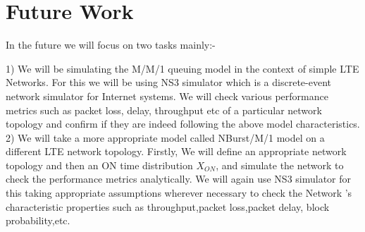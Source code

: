 \chapter{Future Work}

In the future we will focus on two tasks mainly:-

1) We will be simulating the M/M/1 queuing model in the context of simple LTE Networks. For this we will be using NS3 simulator which is a discrete-event network simulator for Internet systems. We will check various performance metrics such as packet loss, delay, throughput etc of a particular network topology and confirm if they are indeed following the above model characteristics.\\

2) We will take a more appropriate model called NBurst/M/1 model on a different LTE network topology. Firstly, We will define an appropriate network topology and then an ON time distribution $X_{ON}$, and simulate the network to check the performance metrics analytically. We will again use NS3 simulator for this taking appropriate assumptions wherever necessary to check the Network 's characteristic properties such as throughput,packet loss,packet delay, block probability,etc.









